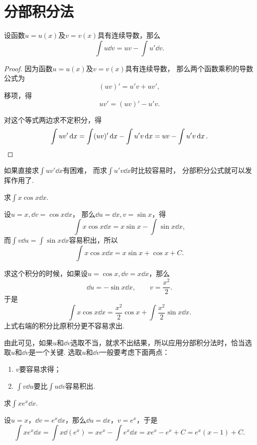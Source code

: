 \section{分部积分法}
\begin{theorem}[分部积分公式]
设函数\(u=u(x)\)及\(v=v(x)\)具有连续导数，那么\[
	\int u \dd{v} = uv - \int u' \dd{v}.
\]
\begin{proof}
因为函数\(u=u(x)\)及\(v=v(x)\)具有连续导数，
那么两个函数乘积的导数公式为\[
	(uv)' = u'v + uv',
\]
移项，得\[
	uv' = (uv)' - u'v.
\]

对这个等式两边求不定积分，得\[
	\int u v' \dd{x} = \int (uv)' \dd{x} - \int u' v \dd{x}
	= uv - \int u' v \dd{x}.
	\qedhere
\]
\end{proof}
\end{theorem}
如果直接求\(\int u v' \dd{x}\)有困难，
而求\(\int u' v \dd{x}\)时比较容易时，
分部积分公式就可以发挥作用了.

\begin{example}
求\(\int x \cos x \dd{x}\).
\begin{solution}
设\(u = x, \dd{v} = \cos x \dd{x}\)，
那么\(\dd{u} = \dd{x}, v = \sin x\)，得\[
	\int x \cos x \dd{x}
	= x \sin x - \int \sin x \dd{x},
\]
而\(\int v \dd{u} = \int \sin x \dd{x}\)容易积出，所以\[
	\int x \cos x \dd{x}
	= x \sin x + \cos x + C.
\]

求这个积分的时候，如果设\(u = \cos x, \dd{v} = x \dd{x}\)，那么\[
\dd{u} = -\sin x \dd{x}, \qquad v = \frac{x^2}{2}.
\]于是\[
\int x \cos x \dd{x} = \frac{x^2}{2} \cos x + \int \frac{x^2}{2} \sin x \dd{x}.
\]上式右端的积分比原积分更不容易求出.
\end{solution}
\end{example}
由此可见，如果\(u\)和\(\dd{v}\)选取不当，就求不出结果，所以应用分部积分法时，恰当选取\(u\)和\(\dd{v}\)是一个关键.
选取\(u\)和\(\dd{v}\)一般要考虑下面两点：\begin{enumerate}
\item \(v\)要容易求得；
\item \(\int v \dd{u}\)要比\(\int u \dd{v}\)容易积出.
\end{enumerate}

\begin{example}
求\(\int x e^x \dd{x}\).
\begin{solution}
设\(u = x\)，\(\dd{v} = e^x \dd{x}\)，那么\(\dd{u} = \dd{x}\)，\(v = e^x\)，于是\[
\int x e^x \dd{x}
= \int x \dd(e^x)
= x e^x - \int e^x \dd{x}
= x e^x - e^x + C
= e^x (x - 1) + C.
\]
\end{solution}
\end{example}


